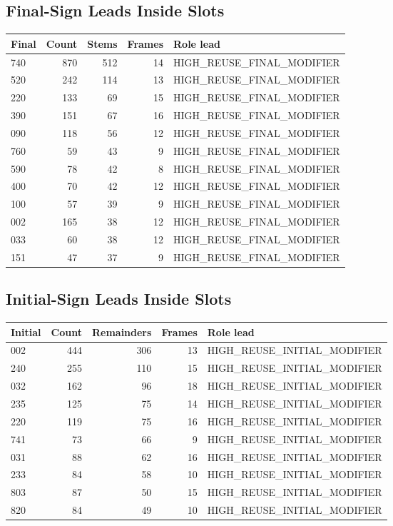 \documentclass[11pt,a4paper]{article}
\begin{document}
\subsection*{Final-Sign Leads Inside Slots}
\begin{center}
\begin{tabular}{lrrrl}
\toprule
\textbf{Final} & \textbf{Count} & \textbf{Stems} & \textbf{Frames} & \textbf{Role lead} \\
\midrule
740 & 870 & 512 & 14 & HIGH\_REUSE\_FINAL\_MODIFIER \\
520 & 242 & 114 & 13 & HIGH\_REUSE\_FINAL\_MODIFIER \\
220 & 133 & 69 & 15 & HIGH\_REUSE\_FINAL\_MODIFIER \\
390 & 151 & 67 & 16 & HIGH\_REUSE\_FINAL\_MODIFIER \\
090 & 118 & 56 & 12 & HIGH\_REUSE\_FINAL\_MODIFIER \\
760 & 59 & 43 & 9 & HIGH\_REUSE\_FINAL\_MODIFIER \\
590 & 78 & 42 & 8 & HIGH\_REUSE\_FINAL\_MODIFIER \\
400 & 70 & 42 & 12 & HIGH\_REUSE\_FINAL\_MODIFIER \\
100 & 57 & 39 & 9 & HIGH\_REUSE\_FINAL\_MODIFIER \\
002 & 165 & 38 & 12 & HIGH\_REUSE\_FINAL\_MODIFIER \\
033 & 60 & 38 & 12 & HIGH\_REUSE\_FINAL\_MODIFIER \\
151 & 47 & 37 & 9 & HIGH\_REUSE\_FINAL\_MODIFIER \\
\bottomrule
\end{tabular}
\end{center}
\subsection*{Initial-Sign Leads Inside Slots}
\begin{center}
\begin{tabular}{lrrrl}
\toprule
\textbf{Initial} & \textbf{Count} & \textbf{Remainders} & \textbf{Frames} & \textbf{Role lead} \\
\midrule
002 & 444 & 306 & 13 & HIGH\_REUSE\_INITIAL\_MODIFIER \\
240 & 255 & 110 & 15 & HIGH\_REUSE\_INITIAL\_MODIFIER \\
032 & 162 & 96 & 18 & HIGH\_REUSE\_INITIAL\_MODIFIER \\
235 & 125 & 75 & 14 & HIGH\_REUSE\_INITIAL\_MODIFIER \\
220 & 119 & 75 & 16 & HIGH\_REUSE\_INITIAL\_MODIFIER \\
741 & 73 & 66 & 9 & HIGH\_REUSE\_INITIAL\_MODIFIER \\
031 & 88 & 62 & 16 & HIGH\_REUSE\_INITIAL\_MODIFIER \\
233 & 84 & 58 & 10 & HIGH\_REUSE\_INITIAL\_MODIFIER \\
803 & 87 & 50 & 15 & HIGH\_REUSE\_INITIAL\_MODIFIER \\
820 & 84 & 49 & 10 & HIGH\_REUSE\_INITIAL\_MODIFIER \\
\bottomrule
\end{tabular}
\end{center}
\end{document}
